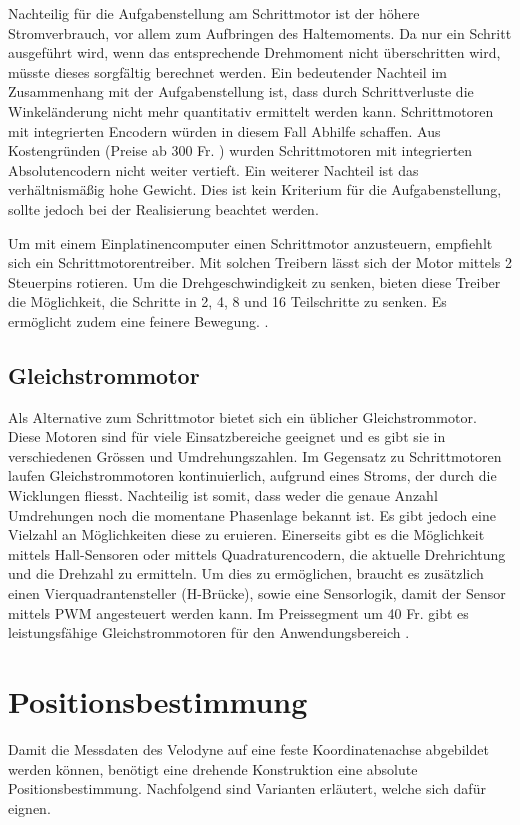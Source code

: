 Nachteilig für die Aufgabenstellung am Schrittmotor ist der höhere Stromverbrauch, vor allem zum Aufbringen des Haltemoments. Da nur ein Schritt ausgeführt wird, wenn das entsprechende Drehmoment nicht überschritten wird, müsste dieses sorgfältig berechnet werden. Ein bedeutender Nachteil im Zusammenhang mit der Aufgabenstellung ist, dass durch Schrittverluste die Winkeländerung nicht mehr quantitativ ermittelt werden kann. Schrittmotoren mit integrierten Encodern würden in diesem Fall Abhilfe schaffen. Aus Kostengründen (Preise ab 300 Fr. \cite{mouserstepper}) wurden Schrittmotoren mit integrierten Absolutencodern nicht weiter vertieft. 
Ein weiterer Nachteil ist das verhältnismäßig hohe Gewicht. Dies ist kein Kriterium für die Aufgabenstellung, sollte jedoch bei der Realisierung beachtet werden.

Um mit einem Einplatinencomputer einen Schrittmotor anzusteuern, empfiehlt sich ein Schrittmotorentreiber. Mit solchen Treibern lässt sich der Motor mittels 2 Steuerpins rotieren. Um die Drehgeschwindigkeit zu senken, bieten diese Treiber die Möglichkeit, die Schritte in 2, 4, 8 und 16 Teilschritte zu senken. Es ermöglicht zudem eine feinere Bewegung. \cite{DRV8825}.

\subsection{Gleichstrommotor}
\label{subsec:Gleichstrommotor}
Als Alternative zum Schrittmotor bietet sich ein üblicher Gleichstrommotor. Diese Motoren sind für viele Einsatzbereiche geeignet und es gibt sie in verschiedenen Grössen und Umdrehungszahlen. Im Gegensatz zu Schrittmotoren laufen Gleichstrommotoren kontinuierlich, aufgrund eines Stroms, der durch die Wicklungen fliesst. Nachteilig ist somit, dass weder die genaue Anzahl Umdrehungen noch die momentane Phasenlage bekannt ist. Es gibt jedoch eine Vielzahl an Möglichkeiten diese zu eruieren. Einerseits gibt es die Möglichkeit mittels Hall-Sensoren oder mittels Quadraturencodern, die aktuelle Drehrichtung und die Drehzahl zu ermitteln. Um dies zu ermöglichen, braucht es zusätzlich einen Vierquadrantensteller (H-Brücke), sowie eine Sensorlogik, damit der Sensor mittels \ac{PWM} angesteuert werden kann. Im Preissegment um 40 Fr. gibt es leistungsfähige Gleichstrommotoren für den Anwendungsbereich \cite{pololumotor}.

\section{Positionsbestimmung}
\label{sec:position}
Damit die Messdaten des Velodyne auf eine feste Koordinatenachse abgebildet werden können, benötigt eine drehende Konstruktion eine absolute Positionsbestimmung. Nachfolgend sind Varianten erläutert, welche sich dafür eignen.

